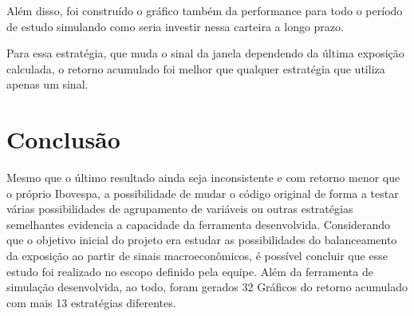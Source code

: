 Além disso, foi construído o gráfico também da performance para todo o período de estudo simulando como seria investir nessa carteira a longo prazo.

Para essa estratégia, que muda o sinal da janela dependendo da última exposição calculada, o retorno acumulado foi melhor que qualquer estratégia que utiliza apenas um sinal. 

\section{Conclusão}

Mesmo que o último resultado ainda seja inconsistente e com retorno menor que o próprio Ibovespa, a possibilidade de mudar o código original de forma a testar várias possibilidades de agrupamento de variáveis ou outras estratégias semelhantes evidencia a capacidade da ferramenta desenvolvida. Considerando que o objetivo inicial do projeto era estudar as possibilidades do balanceamento da exposição ao partir de sinais macroeconômicos, é possível concluir que esse estudo foi realizado no escopo definido pela equipe. Além da ferramenta de simulação desenvolvida, ao todo, foram gerados 32 Gráficos do retorno acumulado com mais 13 estratégias diferentes.
